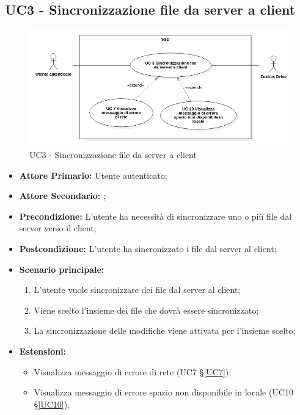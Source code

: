 \subsection{UC3 - Sincronizzazione file da server a client}
\begin{figure}[H]
    \centering
    \includegraphics[scale = 0.5]{components/img/UC3.png}
    \caption{UC3 - Sincronizzazione file da server a client}
\end{figure}
\begin{itemize}
\item \textbf{Attore Primario:} Utente autenticato;
\item \textbf{Attore Secondario:} ;
\item \textbf{Precondizione:} L'utente ha necessità di sincronizzare uno o più file dal server verso il client;
\item \textbf{Postcondizione:} L'utente ha sincronizzato i file dal server al client;
\item \textbf{Scenario principale:}
    \begin{enumerate}
    \item L'utente vuole sincronizzare dei file dal server al client;
    \item Viene scelto l'insieme dei file che dovrà essere sincronizzato;
    \item La sincronizzazione delle modifiche viene attivata per l'insieme scelto;
    \end{enumerate}
\item \textbf{Estensioni:}
    \begin{itemize}
    \item Visualizza messaggio di errore di rete (UC7 \S{}\ref{UC7});
    \item Visualizza messaggio di errore spazio non disponibile in locale (UC10 \S{}\ref{UC10}).
\end{itemize}
\end{itemize}

